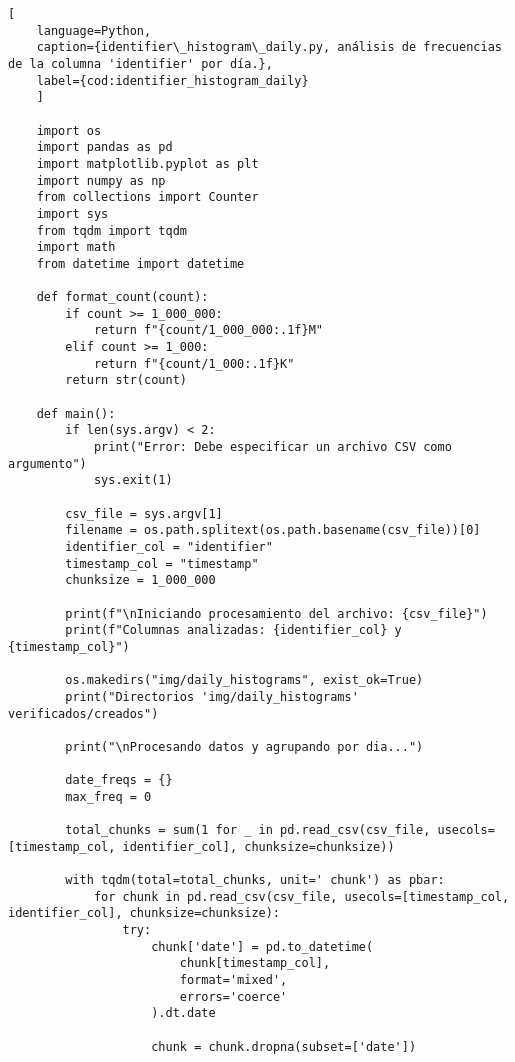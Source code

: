 \begin{lstlisting}[
    language=Python,
    caption={identifier\_histogram\_daily.py, análisis de frecuencias de la columna 'identifier' por día.},
    label={cod:identifier_histogram_daily}
    ]

    import os
    import pandas as pd
    import matplotlib.pyplot as plt
    import numpy as np
    from collections import Counter
    import sys
    from tqdm import tqdm
    import math
    from datetime import datetime

    def format_count(count):
        if count >= 1_000_000:
            return f"{count/1_000_000:.1f}M"
        elif count >= 1_000:
            return f"{count/1_000:.1f}K"
        return str(count)

    def main():
        if len(sys.argv) < 2:
            print("Error: Debe especificar un archivo CSV como argumento")
            sys.exit(1)

        csv_file = sys.argv[1]
        filename = os.path.splitext(os.path.basename(csv_file))[0]
        identifier_col = "identifier"
        timestamp_col = "timestamp"
        chunksize = 1_000_000
        
        print(f"\nIniciando procesamiento del archivo: {csv_file}")
        print(f"Columnas analizadas: {identifier_col} y {timestamp_col}")
        
        os.makedirs("img/daily_histograms", exist_ok=True)
        print("Directorios 'img/daily_histograms' verificados/creados")

        print("\nProcesando datos y agrupando por dia...")
        
        date_freqs = {}
        max_freq = 0
        
        total_chunks = sum(1 for _ in pd.read_csv(csv_file, usecols=[timestamp_col, identifier_col], chunksize=chunksize))
        
        with tqdm(total=total_chunks, unit=' chunk') as pbar:
            for chunk in pd.read_csv(csv_file, usecols=[timestamp_col, identifier_col], chunksize=chunksize):
                try:
                    chunk['date'] = pd.to_datetime(
                        chunk[timestamp_col], 
                        format='mixed',  
                        errors='coerce' 
                    ).dt.date
                    
                    chunk = chunk.dropna(subset=['date'])
                    

\end{lstlisting}
